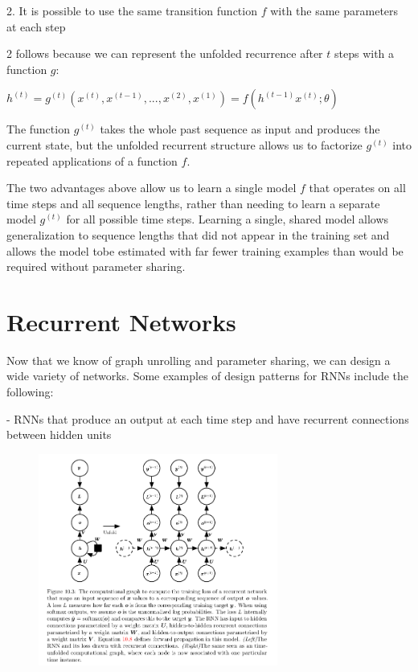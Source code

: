 \documentclass[onecolumn, letterpaper, 12pt]{report}
\begin{document}
2. It is possible to use the same transition function $f$ with the same parameters at each step

2 follows because we can represent the unfolded recurrence after $t$ steps with a function $g$: 

\begin{center}
  $h^{(t)} = g^{(t)}(x^{(t)}, x^{(t-1)}, ..., x^{(2)}, x^{(1)}) = f(h^{(t-1)}x^{(t)}; \theta)$
\end{center}

The function $g^{(t)}$ takes the whole past sequence as input and produces the current state, but the unfolded recurrent structure allows us to factorize $g^{(t)}$ into repeated applications of a function $f$. 

The two advantages above allow us to learn a single model $f$ that operates on all time steps and all sequence lengths, rather than needing to learn a separate model $g^{(t)}$ for all possible time steps. Learning a single, shared model allows generalization to sequence lengths that did not appear in the training set and allows the model tobe estimated with far fewer training examples than would be required without parameter sharing. 

\section{Recurrent Networks}

Now that we know of graph unrolling and parameter sharing, we can design a wide variety of networks. Some examples of design patterns for RNNs include the following:

- RNNs that produce an output at each time step and have recurrent connections between hidden units

\begin{figure}[h]
  \centering
  \includegraphics[width=0.7\textwidth]{rnn_dp_1.png}
\end{figure}
\end{document}
